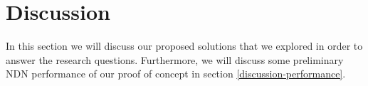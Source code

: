\section{Discussion}\label{disc}





In this section we will discuss our proposed solutions that we explored in order to answer the research questions. Furthermore, we will discuss some preliminary NDN performance of our proof of concept in section \ref{discussion-performance}.

